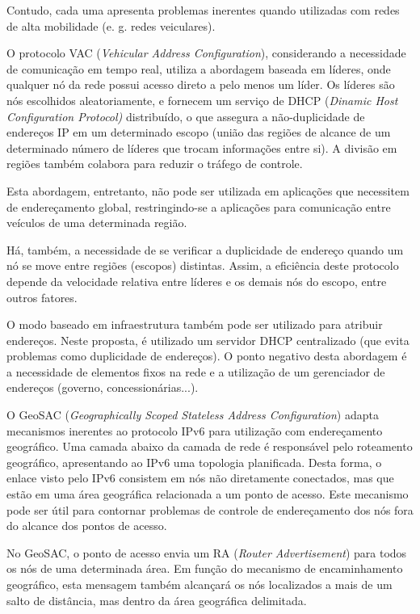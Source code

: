\documentclass[12pt,twoside,a4paper]{article}
\begin{document}
Contudo, cada uma apresenta problemas inerentes quando utilizadas com redes de alta mobilidade (e. g. redes veiculares).

O protocolo VAC (\textit{Vehicular Address Configuration}), considerando a necessidade de comunicação em tempo real, utiliza a abordagem baseada em líderes, onde qualquer nó da rede possui acesso direto a pelo menos um líder. Os líderes são nós escolhidos aleatoriamente, e fornecem um serviço de DHCP (\textit{Dinamic Host Configuration Protocol)} distribuído, o que assegura a não-duplicidade de endereços IP em um determinado escopo (união das
regiões de alcance de um determinado número de líderes que trocam informações entre
si). A divisão em regiões também colabora para reduzir o tráfego de controle.

Esta abordagem, entretanto, não pode ser utilizada em aplicações que necessitem de endereçamento global, restringindo-se a aplicações para comunicação entre veículos de uma determinada região.

Há, também, a necessidade de se verificar a duplicidade de endereço quando um nó se move entre regiões (escopos) distintas. Assim, a eficiência deste protocolo depende da velocidade relativa entre líderes e os demais nós do escopo, entre outros fatores.

O modo baseado em infraestrutura também pode ser utilizado para atribuir endereços. Neste proposta, é utilizado um servidor DHCP centralizado (que evita problemas como duplicidade de endereços). O ponto negativo desta abordagem é a necessidade de elementos fixos na rede e a utilização de um gerenciador de endereços (governo, concessionárias...).

O GeoSAC (\textit{Geographically Scoped Stateless Address Configuration}) adapta mecanismos inerentes ao protocolo IPv6 para utilização com endereçamento geográfico. Uma camada abaixo da camada de rede é responsável pelo roteamento geográfico, apresentando ao IPv6 uma topologia planificada. Desta forma, o enlace visto pelo IPv6 consistem em nós não diretamente conectados, mas que estão em uma área geográfica relacionada a um ponto de acesso. Este mecanismo pode ser útil para contornar problemas de controle de endereçamento dos nós fora do alcance dos pontos de acesso.

No GeoSAC, o ponto de acesso envia um RA (\textit{Router Advertisement}) para todos os nós de uma determinada área. Em função do mecanismo de encaminhamento geográfico, esta mensagem também alcançará os nós localizados a mais de um salto de distância, mas dentro da área geográfica delimitada.\nocite{Rubinstein}



\end{document}
